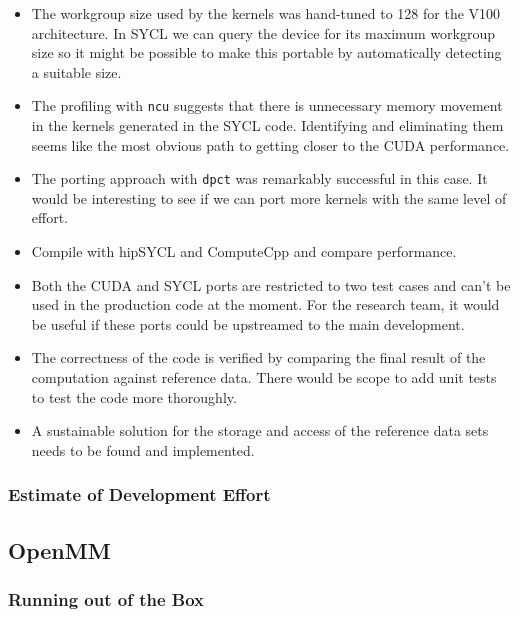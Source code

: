 \begin{itemize}
	\item The workgroup size used by the kernels was hand-tuned to 128 for the V100 architecture. In SYCL we can query the device for its maximum workgroup size so it might be possible to make this portable by automatically detecting a suitable size.
	\item The profiling with \verb #ncu# suggests that there is unnecessary memory movement in the kernels generated in the SYCL code. Identifying and eliminating them seems like the most obvious path to getting closer to the CUDA performance.
	\item The porting approach with \verb #dpct# was remarkably successful in this case. It would be interesting to see if we can port more kernels with the same level of effort.
	\item Compile with hipSYCL and ComputeCpp and compare performance.
	\item Both the CUDA and SYCL ports are restricted to two test cases and can't be used in the production code at the moment. For the research team, it would be useful if these ports could be upstreamed to the main development.
	\item The correctness of the code is verified by comparing the final result of the computation against reference data. There would be scope to add unit tests to test the code more thoroughly.
	\item A sustainable solution for the storage and access of the reference data sets needs to be found and implemented. 
\end{itemize}

\subsubsection{Estimate of Development Effort}

\subsection{OpenMM}

\subsubsection{Running out of the Box}

